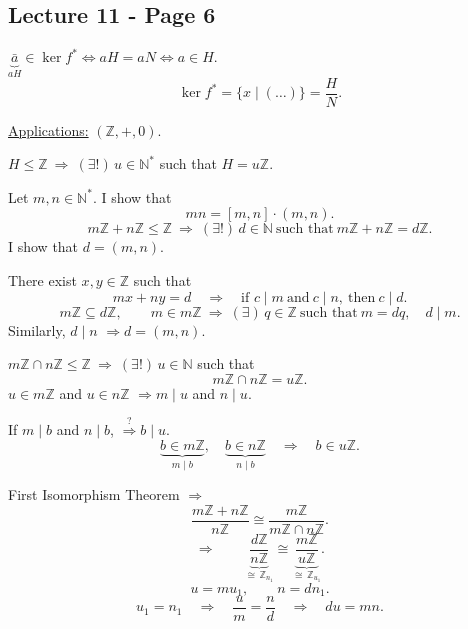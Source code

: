 
\subsection*{Lecture 11 - Page 6}

\noindent $\underbrace{\bar a}_{aH}\in\ker f^*
\iff aH=aN\iff a\in H$.
\[
\ker f^*=\{x\mid (\ldots)\}=\frac{H}{N}.
\]

\bigskip
\noindent\underline{Applications:} \quad $(\mathbb Z,+,0)$.

\medskip
\noindent $H\leq\mathbb Z\ \Longrightarrow\ (\exists!)\,u\in\mathbb N^*$
 such that $H=u\mathbb Z$.

\bigskip
\noindent Let $m,n\in\mathbb N^*$. I show that
\[
mn=[m,n]\cdot(m,n).
\]
\[
m\mathbb Z+n\mathbb Z\leq\mathbb Z
\ \Longrightarrow\ (\exists!)\,d\in\mathbb N\ \text{such that}\
m\mathbb Z+n\mathbb Z=d\mathbb Z.
\]
\noindent I show that $d=(m,n)$.

\medskip
\noindent There exist $x,y\in\mathbb Z$ such that
\[
mx+ny=d
\quad\Longrightarrow\quad
\text{if } c\mid m\ \text{and}\ c\mid n,
\ \text{then}\ c\mid d.
\]
\[
m\mathbb Z\subseteq d\mathbb Z,\qquad
m\in m\mathbb Z\ \Longrightarrow\ (\exists)\,q\in\mathbb Z
\ \text{such that}\ m=dq,\quad d\mid m.
\]
\noindent Similarly, $d\mid n$ $\Longrightarrow d=(m,n)$.

\bigskip
\noindent $m\mathbb Z\cap n\mathbb Z\leq\mathbb Z\ \Longrightarrow\
(\exists!)\,u\in\mathbb N$ such that
\[
m\mathbb Z\cap n\mathbb Z=u\mathbb Z.
\]
\noindent $u\in m\mathbb Z$ and $u\in n\mathbb Z$
$\Longrightarrow m\mid u$ and $n\mid u$.

\noindent If $m\mid b$ and $n\mid b$,
$\stackrel{?}{\Longrightarrow} b\mid u$.
\[
\underbrace{b\in m\mathbb Z}_{m\mid b},\quad
\underbrace{b\in n\mathbb Z}_{n\mid b}
\quad\Longrightarrow\quad b\in u\mathbb Z.
\]

\bigskip
\noindent First Isomorphism Theorem $\Longrightarrow$
\[
\frac{m\mathbb Z+n\mathbb Z}{n\mathbb Z}
\cong \frac{m\mathbb Z}{m\mathbb Z\cap n\mathbb Z}.
\]
\[
\Longrightarrow\qquad
\underbrace{\frac{d\mathbb Z}{n\mathbb Z}}_{\cong\,\mathbb Z_{n_1}}
\cong
\underbrace{\frac{m\mathbb Z}{u\mathbb Z}}_{\cong\,\mathbb Z_{u_1}}.
\]
\[
u=m u_1,\qquad n=d n_1.
\]
\[
u_1=n_1\quad\Longrightarrow\quad
\frac{u}{m}=\frac{n}{d}\quad\Longrightarrow\quad du=mn.
\]
